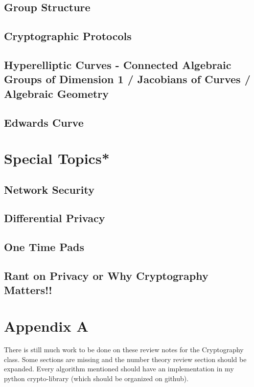 \documentclass[12pt,a4paper]{article}
\begin{document}
\subsection{Group Structure} 
\subsection{Cryptographic Protocols}
\subsection{Hyperelliptic Curves - Connected Algebraic Groups of Dimension 1 / Jacobians of Curves / Algebraic Geometry}
\subsection{Edwards Curve}

\section{Special Topics*}
\subsection{Network Security}
\subsection{Differential Privacy}
\subsection{One Time Pads}
\subsection{Rant on Privacy or Why Cryptography Matters!!}

\section{Appendix A}
There is still much work to be done on these review notes for the Cryptography class. Some sections are missing and the number theory review section should be expanded. Every algorithm mentioned should have an implementation in my python crypto-library (which should be organized on github). 
\end{document}
